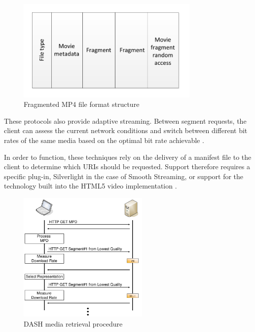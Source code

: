 \documentclass[journal]{IEEEtran}
\begin{document}
\begin{figure}[!t]
\centering
\includegraphics[width=3.5in]{smooth-streaming}
\caption{Fragmented MP4 file format structure \cite{article:watchingVideoOverTheWeb}}
\label{fig:mp4Structure}
\end{figure} 

These protocols also provide adaptive streaming. Between segment requests, the client can assess the current network conditions and switch between different bit rates of the same media based on the optimal bit rate achievable \cite{article:areWeInTheMiddleOfAVideoStreamingRevolution}.

In order to function, these techniques rely on the delivery of a manifest file to the client to determine which URIs should be requested. %
Support therefore requires a specific plug-in, Silverlight in the case of Smooth Streaming, or support for the technology built into the HTML5 video implementation \cite{inproceedings:aSeamlessIntegrationOfAdaptiveHTTPStreaming}. %

\begin{figure}[!t]
\centering
\includegraphics[width=2.5in]{dash-procedure}
\caption{DASH media retrieval procedure \cite{inproceedings:dynamicAdapativeHTTPStreamingLive}}
\label{fig:dashProcedure}
\end{figure} 
\end{document}
